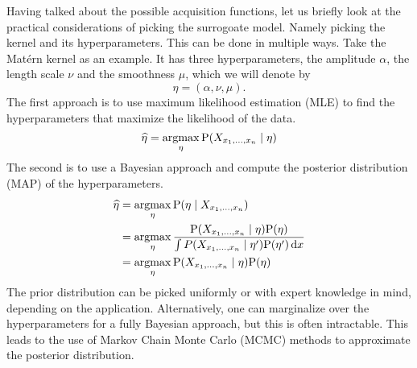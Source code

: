Having talked about the possible acquisition functions, let us briefly look at the practical considerations of picking the surrogoate model.
Namely picking the kernel and its hyperparameters.
This can be done in multiple ways.
Take the Matérn kernel as an example. It has three hyperparameters, the amplitude $\alpha$, the length scale $\nu$ and the smoothness $\mu$, which we will denote by
\[
    \eta = (\alpha, \nu, \mu).
\]  
The first approach is to use maximum likelihood estimation (MLE) to find the hyperparameters that maximize the likelihood of the data. 
\[
    \widehat{\eta} = \operatorname*{argmax}_{\eta} \mathrm{P}(X_{x_{1}, \dots, x_{n}} \mid \eta)
\]
The second is to use a Bayesian approach and compute the posterior distribution (MAP) of the hyperparameters. 
\begin{align*}
    \widehat{\eta} &= \operatorname*{argmax}_{\eta} \mathrm{P}(\eta \mid X_{x_{1}, \dots, x_{n}}) \\
    &= \operatorname*{argmax}_{\eta} \frac{\mathrm{P}(X_{x_{1}, \dots, x_{n}} \mid \eta) \mathrm{P}(\eta) }{\int P(X_{x_{1}, \dots, x_{n}} \mid \eta') \mathrm{P}(\eta') \,\mathrm{d} x} \\
    &= \operatorname*{argmax}_{\eta} \mathrm{P}(X_{x_{1}, \dots, x_{n}} \mid \eta) \mathrm{P}(\eta)
\end{align*}
The prior distribution can be picked uniformly or with expert knowledge in mind, depending on the application.
Alternatively, one can marginalize over the hyperparameters for a fully Bayesian approach, but this is often intractable. This leads to the use of Markov Chain Monte Carlo (MCMC) methods to approximate the posterior distribution.




